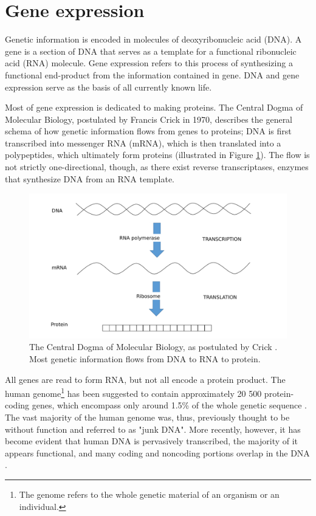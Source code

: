 
\section{Gene expression}\label{gene-expression}

Genetic information is encoded in molecules of deoxyribonucleic acid (DNA). A
gene is a section of DNA that serves as a template for a functional
ribonucleic acid (RNA) molecule. Gene expression refers to this process of
synthesizing a functional end-product from the information contained in gene.
DNA and gene expression serve as the basis of all currently known life. \citep{Strachan2011}

Most of gene expression is dedicated to making proteins. The Central Dogma of
Molecular Biology, postulated by Francis Crick in 1970, describes the general
schema of how genetic information flows from genes to proteins; DNA is first
transcribed into messenger RNA (mRNA), which is then translated into a polypeptides,
which ultimately form proteins \citep{Crick1970}
(illustrated in Figure \ref{fig:central-dogma}). The flow is not strictly
one-directional, though, as there exist reverse transcriptases, enzymes that
synthesize DNA from an RNA template.

\begin{figure}[!h]
  \centering
  \includegraphics[width=.8\linewidth]{figures/central_dogma.pdf}
  \caption{The Central Dogma of Molecular Biology, as postulated by Crick \citep{Crick1970}.
  Most genetic information flows from DNA to RNA to protein.}
  \label{fig:central-dogma}
\end{figure}

All genes are read to form RNA, but not all encode a protein product. The
human genome\footnote{The genome refers to the whole genetic material of an
organism or an individual.} has been suggested to contain approximately 20 500
protein-coding genes, which encompass only around 1.5\% of the whole genetic
sequence \citep{Clamp2007}. The vast majority of the human genome was, thus,
previously thought to be without function and referred to as "junk DNA". More
recently, however, it has become evident that human DNA is pervasively
transcribed, the majority of it appears functional, and many coding and
noncoding portions overlap in the DNA \citep{Strachan2011}.

